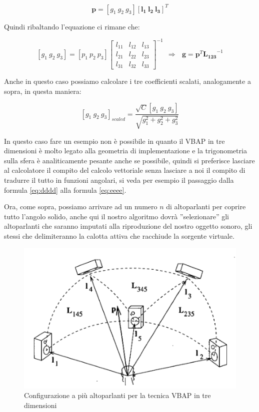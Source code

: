 \documentclass[12pt,a4paper]{report}
\begin{document}
\begin{equation}
\boldsymbol{p} = \left[ g_1 \ g_2 \ g_3 \right] \left[ \boldsymbol{l_{1}} \ \boldsymbol{l_{2}} \ \boldsymbol{l_{3}} \right]^T
\label{gggg}
\end{equation}

Quindi ribaltando l'equazione ci rimane che:

\begin{equation}
\left[g_1 \ g_2 \ g_3 \right] = \left[ p_1 \ p_2 \ p_3 \right]  {\left[\begin{matrix}
l_{11} & l_{12} & l_{13}\\ l_{21} & l_{22} & l_{23} \\ l_{31} & l_{32} & l_{33}
\end{matrix} \right]}^{-1} \ \ \Rightarrow \ \ \ \boldsymbol{g}=\boldsymbol{p}^T {\boldsymbol{L_{123}}}^{-1}
\label{hhhh}
\end{equation}

Anche in questo caso possiamo calcolare i tre coefficienti scalati, analogamente a sopra, in questa maniera:

\begin{equation}
\left[g_1 \ g_2 \ g_3 \right]_{scaled} = \dfrac{\sqrt{C} \left[ g_1 \ g_2 \ g_3 \right]}{\sqrt{g_1^2 + g_2^2 + g_3^2}}
\label{iiii}
\end{equation}

In questo caso fare un esempio non è possibile in quanto il VBAP in tre dimensioni è molto legato alla geometria di implementazione e la trigonometria sulla sfera è analiticamente pesante anche se possibile, quindi si preferisce lasciare al calcolatore il compito del calcolo vettoriale senza lasciare a noi il compito di tradurre il tutto in funzioni angolari, si veda per esempio il passaggio dalla formula \ref{eq:dddd} alla formula \ref{eq:eeee}. 

Ora, come sopra, possiamo arrivare ad un numero $n$ di altoparlanti per coprire tutto l'angolo solido, anche qui il nostro algoritmo dovrà ''selezionare'' gli altoparlanti che saranno imputati alla riproduzione del nostro oggetto sonoro, gli stessi che delimiteranno la calotta attiva che racchiude la sorgente virtuale.

\begin{figure}[htbp]
	\centering
	\includegraphics[scale=0.50 ]{figures/matrix3dfull.png}
	\caption {Configurazione a più altoparlanti per la tecnica VBAP in tre dimensioni}
	\label{fig:matrix3dfull}
	\end{figure}
\end{document}
